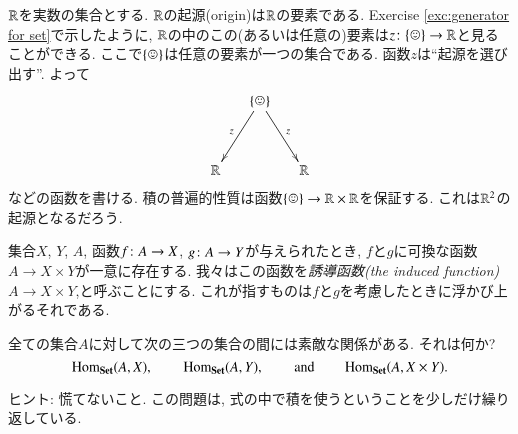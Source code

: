 \begin{example}


${\mathbb R}$を実数の集合とする. ${\mathbb R}$の起源(origin)は${\mathbb R}$の要素である. Exercise \ref{exc:generator for set}で示したように, ${\mathbb R}$の中のこの(あるいは任意の)要素は$z\taking\singleton\to\RR$と見ることができる. ここで$\singleton$は任意の要素が一つの集合である. 函数$z$は``起源を選び出す''. よって
$$\xymatrix@=15pt{&\singleton\ar[ddr]^z\ar[ddl]_z\\\\\RR&&\RR}
$$
などの函数を書ける. 積の普遍的性質は函数$\singleton\to\RR\times\RR$を保証する. これは${\mathbb R}^2$の起源となるだろう.

\end{example}

\begin{remark}


集合$X$, $Y$, $A$, 函数$f\colon A\rightarrow X$, $g\colon A\rightarrow Y$が与えられたとき, $f$と$g$に可換な函数$A\to X\times Y$が一意に存在する. 我々はこの函数を\emph{誘導函数(the induced function) $A\to X\times Y$},と呼ぶことにする. これが指すものは$f$と$g$を考慮したときに浮かび上がるそれである.

\end{remark}

\begin{exercise}

全ての集合$A$に対して次の三つの集合の間には素敵な関係がある. それは何か?
$$\textrm{Hom}_{{\bf Set}}(A,X), \hspace{.3in} \textrm{Hom}_{\bf Set}(A,Y), \hspace{.3in} \text{and} \hspace{.3in}\textrm{Hom}_{\bf Set}(A,X\times Y).$$

ヒント: 慌てないこと. この問題は, 式の中で積を使うということを少しだけ繰り返している.

\end{exercise}

